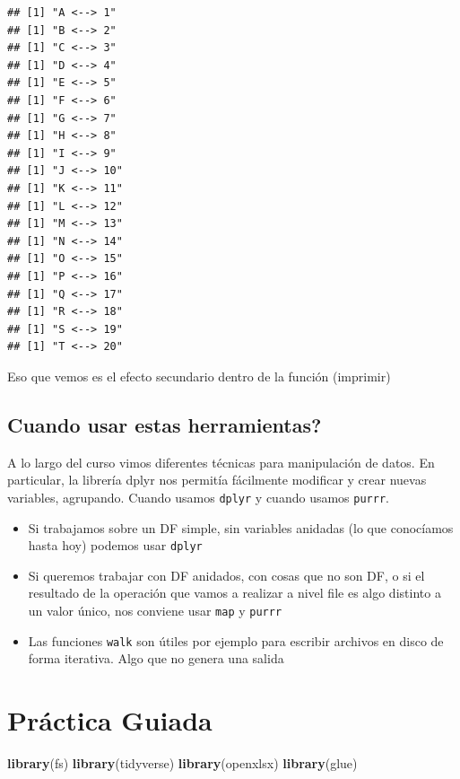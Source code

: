 \documentclass[]{book}
\newenvironment{Shaded}{\begin{snugshade}}{\end{snugshade}}
\newcommand{\KeywordTok}[1]{\textcolor[rgb]{0.13,0.29,0.53}{\textbf{#1}}}
\newcommand{\NormalTok}[1]{#1}
\begin{document}
\begin{verbatim}
## [1] "A <--> 1"
## [1] "B <--> 2"
## [1] "C <--> 3"
## [1] "D <--> 4"
## [1] "E <--> 5"
## [1] "F <--> 6"
## [1] "G <--> 7"
## [1] "H <--> 8"
## [1] "I <--> 9"
## [1] "J <--> 10"
## [1] "K <--> 11"
## [1] "L <--> 12"
## [1] "M <--> 13"
## [1] "N <--> 14"
## [1] "O <--> 15"
## [1] "P <--> 16"
## [1] "Q <--> 17"
## [1] "R <--> 18"
## [1] "S <--> 19"
## [1] "T <--> 20"
\end{verbatim}

Eso que vemos es el efecto secundario dentro de la función (imprimir)

\hypertarget{cuando-usar-estas-herramientas}{%
\subsection{Cuando usar estas herramientas?}\label{cuando-usar-estas-herramientas}}

A lo largo del curso vimos diferentes técnicas para manipulación de datos. En particular, la librería dplyr nos permitía fácilmente modificar y crear nuevas variables, agrupando. Cuando usamos \texttt{dplyr} y cuando usamos \texttt{purrr}.

\begin{itemize}
\item
  Si trabajamos sobre un DF simple, sin variables anidadas (lo que conocíamos hasta hoy) podemos usar \texttt{dplyr}
\item
  Si queremos trabajar con DF anidados, con cosas que no son DF, o si el resultado de la operación que vamos a realizar a nivel file es algo distinto a un valor único, nos conviene usar \texttt{map} y \texttt{purrr}
\item
  Las funciones \texttt{walk} son útiles por ejemplo para escribir archivos en disco de forma iterativa. Algo que no genera una salida
\end{itemize}

\hypertarget{practica-guiada-1}{%
\section{Práctica Guiada}\label{practica-guiada-1}}

\begin{Shaded}
\begin{Highlighting}[]
\KeywordTok{library}\NormalTok{(fs)}
\KeywordTok{library}\NormalTok{(tidyverse)}
\KeywordTok{library}\NormalTok{(openxlsx)}
\KeywordTok{library}\NormalTok{(glue)}
\end{Highlighting}
\end{Shaded}
\end{document}
